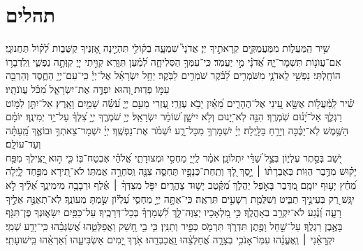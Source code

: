 \documentclass[a4paper, twoside, openany, parskip=half, 10pt]{article}
\begin{document}
\section*{תהלים}
\begin{multicols}{2}
שִׁ֥יר הַֽמַּעֲל֑וֹת מִמַּעֲמַקִּ֖ים קְרָאתִ֣יךָ יְיָ׃ 
 אֲדֹנָי֮ שִׁמְעָ֪ה בְק֫וֹלִ֥י תִּהְיֶ֣ינָה אָ֭זְנֶיךָ קַשֻּׁב֑וֹת לְ֝ק֗וֹל תַּחֲנוּנָֽי׃ 
 אִם־עֲוֺנ֥וֹת תִּשְׁמָר־יָ֑הּ אֲ֝דֹנָ֗י מִ֣י יַעֲמֹֽד׃ 
 כִּֽי־עִמְּךָ֥ הַסְּלִיחָ֑ה לְ֝מַ֗עַן תִּוָּרֵֽא׃ 
 קִוִּ֣יתִי יְיָ֭ קִוְּתָ֣ה נַפְשִׁ֑י וְֽלִדְבָר֥וֹ הוֹחָֽלְתִּי׃ 
 נַפְשִׁ֥י לַֽאדֹנָ֑י מִשֹּׁמְרִ֥ים לַ֝בֹּ֗קֶר שֹׁמְרִ֥ים לַבֹּֽקֶר׃ 
 יַחֵ֥ל יִשְׂרָאֵ֗ל אֶל־יְיָ֫ כִּֽי־עִם־יְיָ֥ הַחֶ֑סֶד וְהַרְבֵּ֖ה עִמּ֣וֹ פְדֽוּת׃ 
 וְ֭הוּא יִפְדֶּ֣ה אֶת־יִשְׂרָאֵ֑ל מִ֝כֹּ֗ל עֲוֺנֹתָֽיו׃ \\
 
שִׁ֗יר לַֽמַּ֫עֲל֥וֹת אֶשָּׂ֣א עֵ֭ינַי אֶל־הֶהָרִ֑ים מֵ֝אַ֗יִן יָבֹ֥א עֶזְרִֽי׃ 
 עֶ֭זְרִי מֵעִ֣ם יְיָ֑ עֹ֝שֵׂ֗ה שָׁמַ֥יִם וָאָֽרֶץ׃ 
 אַל־יִתֵּ֣ן לַמּ֣וֹט רַגְלֶ֑ךָ אַל־יָ֝נ֗וּם שֹֽׁמְרֶֽךָ׃ 
 הִנֵּ֣ה לֹֽא־יָ֭נוּם וְלֹ֣א יִישָׁ֑ן שׁ֝וֹמֵ֗ר יִשְׂרָאֵֽל׃ 
 יְיָ֥ שֹׁמְרֶ֑ךָ יְיָ֥ צִ֝לְּךָ֗ עַל־יַ֥ד יְמִינֶֽךָ׃ 
 יוֹמָ֗ם הַשֶּׁ֥מֶשׁ לֹֽא־יַכֶּ֗כָּה וְיָרֵ֥חַ בַּלָּֽיְלָה׃ 
 יְיָ֗ יִשְׁמָרְךָ֥ מִכָּל־רָ֑ע יִ֝שְׁמֹ֗ר אֶת־נַפְשֶֽׁךָ׃ 
 יְיָ֗ יִשְׁמָר־צֵאתְךָ֥ וּבוֹאֶ֑ךָ מֵֽ֝עַתָּ֗ה וְעַד־עוֹלָֽם׃ \\
 
יֹ֭שֵׁב בְּסֵ֣תֶר עֶלְי֑וֹן בְּצֵ֥ל שַׁ֝דַּ֗י יִתְלוֹנָֽן׃ 
 אֹמַ֗ר לַֽייָ֭ מַחְסִ֣י וּמְצוּדָתִ֑י אֱ֝לֹהַ֗י אֶבְטַח־בּֽוֹ׃ 
 כִּ֤י ה֣וּא יַ֭צִּֽילְךָ מִפַּ֥ח יָק֗וּשׁ מִדֶּ֥בֶר הַוּֽוֹת׃ 
 בְּאֶבְרָת֨וֹ ׀ יָ֣סֶךְ לָ֭ךְ וְתַֽחַת־כְּנָפָ֣יו תֶּחְסֶ֑ה צִנָּ֖ה וְֽסֹחֵרָ֣ה אֲמִתּֽוֹ׃ 
 לֹא־תִ֭ירָא מִפַּ֣חַד לָ֑יְלָה מֵ֝חֵ֗ץ יָע֥וּף יוֹמָֽם׃ 
 מִ֭דֶּבֶר בָּאֹ֣פֶל יַהֲלֹ֑ךְ מִ֝קֶּ֗טֶב יָשׁ֥וּד צָהֳרָֽיִם׃ 
 יִפֹּ֤ל מִצִּדְּךָ֨ ׀ אֶ֗לֶף וּרְבָבָ֥ה מִימִינֶ֑ךָ אֵ֝לֶ֗יךָ לֹ֣א יִגָּֽשׁ׃ 
 רַ֭ק בְּעֵינֶ֣יךָ תַבִּ֑יט וְשִׁלֻּמַ֖ת רְשָׁעִ֣ים תִּרְאֶֽה׃ 
 כִּֽי־אַתָּ֣ה יְיָ֣ מַחְסִ֑י עֶ֝לְי֗וֹן שַׂ֣מְתָּ מְעוֹנֶֽךָ׃ 
 לֹֽא־תְאֻנֶּ֣ה אֵלֶ֣יךָ רָעָ֑ה וְ֝נֶ֗גַע לֹא־יִקְרַ֥ב בְּאָהֳלֶֽךָ׃ 
 כִּ֣י מַ֭לְאָכָיו יְצַוֶּה־לָּ֑ךְ לִ֝שְׁמָרְךָ֗ בְּכָל־דְּרָכֶֽיךָ׃ 
 עַל־כַּפַּ֥יִם יִשָּׂא֑וּנְךָ פֶּן־תִּגֹּ֖ף בָּאֶ֣בֶן רַגְלֶֽךָ׃ 
 עַל־שַׁ֣חַל וָפֶ֣תֶן תִּדְרֹ֑ךְ תִּרְמֹ֖ס כְּפִ֣יר וְתַנִּֽין׃ 
 כִּ֤י בִ֣י חָ֭שַׁק וַאֲפַלְּטֵ֑הוּ אֲ֝שַׂגְּבֵ֗הוּ כִּֽי־יָדַ֥ע שְׁמִֽי׃ 
 יִקְרָאֵ֨נִי ׀ וְֽאֶעֱנֵ֗הוּ עִמּֽוֹ־אָנֹכִ֥י בְצָרָ֑ה אֲ֝חַלְּצֵ֗הוּ וַֽאֲכַבְּדֵֽהוּ׃ 
 אֹ֣רֶךְ יָ֭מִים אַשְׂבִּיעֵ֑הוּ וְ֝אַרְאֵ֗הוּ בִּֽישׁוּעָתִֽי׃ \\
 

\end{multicols}
\end{document}
